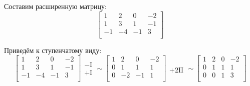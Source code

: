 Составим расширенную матрицу:
\[
	\left[
		\begin{array}{ccc|c}
			1  & 2  & 0  & -2 \\
			1  & 3  & 1  & -1 \\
			-1 & -4 & -1 & 3  \\
		\end{array}
		\right]
\]

Приведём к ступенчатому виду:
\[
	\left[
		\begin{array}{ccc|c}
			1  & 2  & 0  & -2 \\
			1  & 3  & 1  & -1 \\
			-1 & -4 & -1 & 3  \\
		\end{array}
		\right]
	\begin{array}{c}
		\\
		-\text{I} \\
		+\text{I} \\
	\end{array}
	\sim
	\left[
		\begin{array}{ccc|c}
			1 & 2  & 0  & -2 \\
			0 & 1  & 1  & 1  \\
			0 & -2 & -1 & 1  \\
		\end{array}
		\right]
	\begin{array}{c}
		\\
		\\
		+2 \text{II} \\
	\end{array}
	\sim
	\left[
		\begin{array}{ccc|c}
			1 & 2 & 0 & -2 \\
			0 & 1 & 1 & 1  \\
			0 & 0 & 1 & 3  \\
		\end{array}
		\right]
\]

